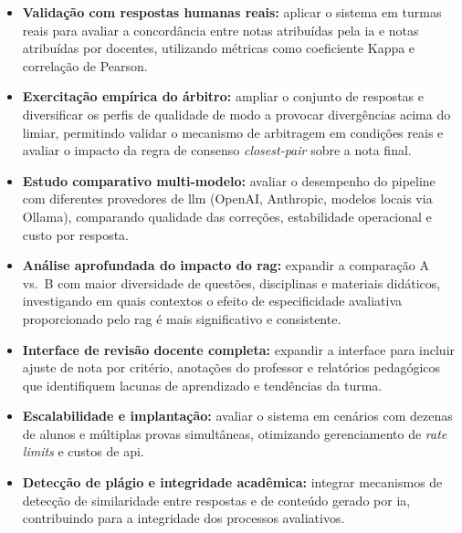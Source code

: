 \begin{itemize}
    \item \textbf{Validação com respostas humanas reais:} aplicar o sistema em turmas reais para avaliar a concordância entre notas atribuídas pela \gls{ia} e notas atribuídas por docentes, utilizando métricas como coeficiente Kappa e correlação de Pearson.

    \item \textbf{Exercitação empírica do árbitro:} ampliar o conjunto de respostas e diversificar os perfis de qualidade de modo a provocar divergências acima do limiar, permitindo validar o mecanismo de arbitragem em condições reais e avaliar o impacto da regra de consenso \textit{closest-pair} sobre a nota final.

    \item \textbf{Estudo comparativo multi-modelo:} avaliar o desempenho do pipeline com diferentes provedores de \gls{llm} (OpenAI, Anthropic, modelos locais via Ollama), comparando qualidade das correções, estabilidade operacional e custo por resposta.

    \item \textbf{Análise aprofundada do impacto do \gls{rag}:} expandir a comparação A vs.\ B com maior diversidade de questões, disciplinas e materiais didáticos, investigando em quais contextos o efeito de especificidade avaliativa proporcionado pelo \gls{rag} é mais significativo e consistente.

    \item \textbf{Interface de revisão docente completa:} expandir a interface para incluir ajuste de nota por critério, anotações do professor e relatórios pedagógicos que identifiquem lacunas de aprendizado e tendências da turma.

    \item \textbf{Escalabilidade e implantação:} avaliar o sistema em cenários com dezenas de alunos e múltiplas provas simultâneas, otimizando gerenciamento de \textit{rate limits} e custos de \gls{api}.

    \item \textbf{Detecção de plágio e integridade acadêmica:} integrar mecanismos de detecção de similaridade entre respostas e de conteúdo gerado por \gls{ia}, contribuindo para a integridade dos processos avaliativos.
\end{itemize}

\glsaddall
